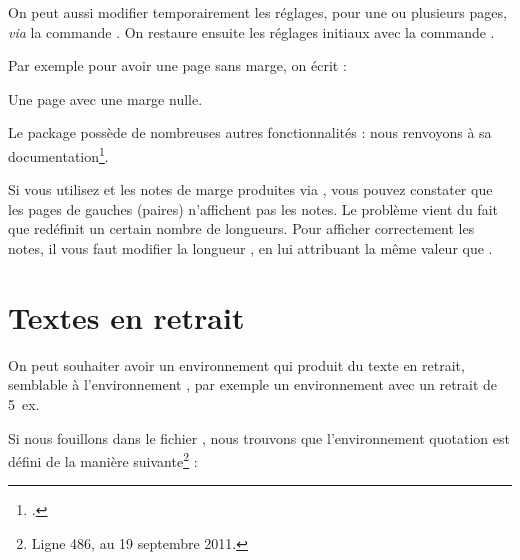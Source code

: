 On peut aussi modifier temporairement les réglages, pour une ou plusieurs pages, \emph{via} la commande . On restaure ensuite les réglages initiaux  avec la commande .

Par exemple pour avoir une page sans marge, on écrit :

\begin{latexcode}
Une page avec une marge nulle.
\newpage
\restoregeometry
\end{latexcode}

Le package  possède de nombreuses autres fonctionnalités : nous renvoyons à sa documentation\footcite{geometry}.

\begin{attention}
Si vous utilisez  et les notes de marge produites via , vous pouvez constater que les pages de gauches (paires) n'affichent pas les notes. Le problème vient du fait que  redéfinit un certain nombre de longueurs. Pour afficher correctement les notes, il vous faut modifier la longueur , en lui attribuant la même valeur que .

\begin{latexcode}
\setlength{\marginparwidth}{\leftmargin}
\end{latexcode}
\end{attention}

\section{Textes en retrait}

On peut souhaiter avoir un environnement qui produit du texte en retrait, semblable à l'environnement , par exemple un environnement  avec un retrait de 5~ex.

Si nous fouillons dans le fichier , nous trouvons que l'environnement quotation est défini de la manière suivante\footnote{Ligne 486, au 19 septembre 2011.} :

\begin{latexcode}
\newenvironment{quotation}
               {\list{}{\listparindent 1.5em %
                        \itemindent    \listparindent
                        \rightmargin   \leftmargin
                        \parsep        \z@ \@plus\p@}%
                \item\relax}
               {\endlist}
\end{latexcode}

